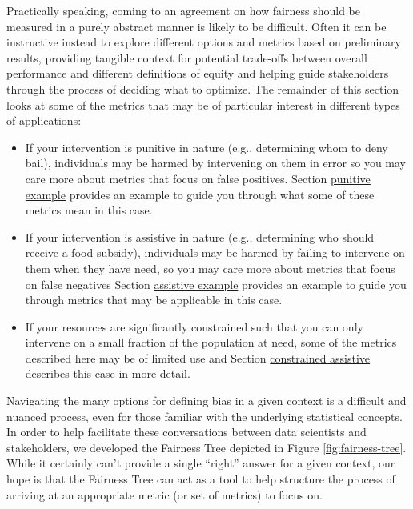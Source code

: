 \documentclass[]{krantz}
\begin{document}
Practically speaking, coming to an agreement on how fairness should be
measured in a purely abstract manner is likely to be difficult. Often it
can be instructive instead to explore different options and metrics
based on preliminary results, providing tangible context for potential
trade-offs between overall performance and different definitions of
equity and helping guide stakeholders through the process of deciding
what to optimize. The remainder of this section looks at some of the
metrics that may be of particular interest in different types of
applications:

\begin{itemize}
\item
  If your intervention is punitive in nature (e.g., determining whom to
  deny bail), individuals may be harmed by intervening on them in error
  so you may care more about metrics that focus on false positives.
  Section \protect\hyperlink{sec:punitiveexample}{punitive example}
  provides an example to guide you through what some of these metrics
  mean in this case.
\item
  If your intervention is assistive in nature (e.g., determining who
  should receive a food subsidy), individuals may be harmed by failing
  to intervene on them when they have need, so you may care more about
  metrics that focus on false negatives Section
  \protect\hyperlink{sec:assistiveexample}{assistive example} provides
  an example to guide you through metrics that may be applicable in this
  case.
\item
  If your resources are significantly constrained such that you can only
  intervene on a small fraction of the population at need, some of the
  metrics described here may be of limited use and Section
  \protect\hyperlink{sec:constrainedassistive}{constrained assistive}
  describes this case in more detail.
\end{itemize}

Navigating the many options for defining bias in a given context is a
difficult and nuanced process, even for those familiar with the
underlying statistical concepts. In order to help facilitate these
conversations between data scientists and stakeholders, we developed the
Fairness Tree depicted in Figure \ref{fig:fairness-tree}. While it
certainly can't provide a single ``right'' answer for a given context,
our hope is that the Fairness Tree can act as a tool to help structure
the process of arriving at an appropriate metric (or set of metrics) to
focus on.
\end{document}
